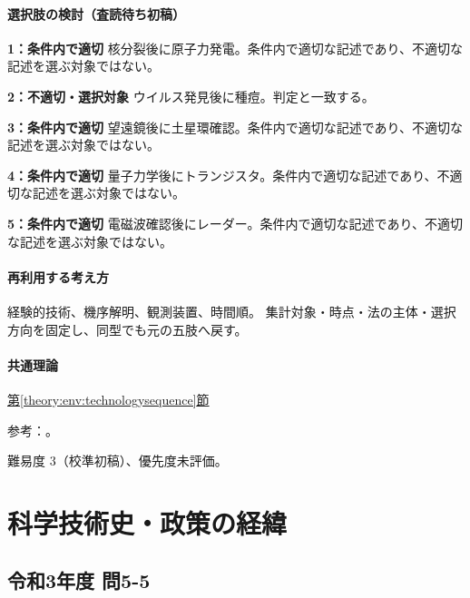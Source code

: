 \paragraph{選択肢の検討（査読待ち初稿）}\mbox{}\par

\noindent\textbf{1：条件内で適切} 核分裂後に原子力発電。条件内で適切な記述であり、不適切な記述を選ぶ対象ではない。\par

\noindent\textbf{2：不適切・選択対象} ウイルス発見後に種痘。判定と一致する。\par

\noindent\textbf{3：条件内で適切} 望遠鏡後に土星環確認。条件内で適切な記述であり、不適切な記述を選ぶ対象ではない。\par

\noindent\textbf{4：条件内で適切} 量子力学後にトランジスタ。条件内で適切な記述であり、不適切な記述を選ぶ対象ではない。\par

\noindent\textbf{5：条件内で適切} 電磁波確認後にレーダー。条件内で適切な記述であり、不適切な記述を選ぶ対象ではない。\par

\paragraph{再利用する考え方} 経験的技術、機序解明、観測装置、時間順。 集計対象・時点・法の主体・選択方向を固定し、同型でも元の五肢へ戻す。

\paragraph{共通理論} \hyperref[theory:env:technologysequence]{第\ref*{theory:env:technologysequence}節}

\par 参考：\cite{env59_jenner}。

\par 難易度 3（校準初稿）、優先度未評価。

\section{科学技術史・政策の経緯}

\subsection{令和3年度 問5-5}
\label{q:r03-reg-basic-5-5}

